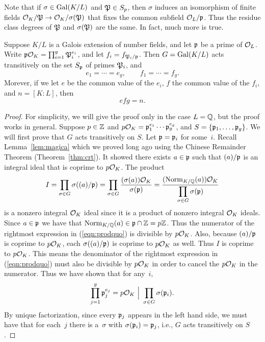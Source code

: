 Note that if $\sigma\in\Gal(K/L)$ and $\P\in S_p$, then $\sigma$
induces an isomorphism of finite fields $\O_K/\P\to \O_K/\sigma(\P)$
that fixes the common subfield $\O_L/\p$.  Thus the residue class
degrees of $\P$ and $\sigma(\P)$ are the same.  In fact, much more is
true.
\begin{theorem}\label{thm:transitive}
Suppose $K/L$ is a Galois extension of number fields,
and let $\p$ be a prime of $\O_L$.  Write
$\p\O_K=\prod_{i=1}^g \P_i^{e_i}$, and let $f_i = f_{\P_i/\p}$.
Then
$G=\Gal(K/L)$ acts transitively on the set
$S_\p$ of primes $\P_i$, and
$$
  e_1=\cdots =e_g, \qquad f_1 =\cdots = f_g.
$$
Morever, if we let $e$ be the common value of the $e_i$,
$f$ the common value of the $f_i$, and $n=[K:L]$, then
$$
   efg=n.
$$
\end{theorem}
\begin{proof}
For simplicity, we will give the proof only in the case $L=\Q$, but
the proof works in general.  Suppose $p\in\Z$ and
$p\O_K=\p_1^{e_1}\cdots \p_g^{e_g}$, and $S=\{\p_1,\ldots, \p_g\}$.  We
will first prove that $G$ acts transitively on $S$.  Let $\p=\p_i$ for
some~$i$.   Recall Lemma~\ref{lem:magica} which we proved long ago using the
Chinese Remainder Theorem (Theorem~\ref{thm:crt}). It showed there exists
$a\in\p$ such that $(a)/\p$ is an integral ideal that is
coprime to $p\O_K$.   The product
\begin{equation}\label{eqn:prodquo}
 I= \prod_{\sigma\in G} \sigma((a)/\p)
   = \prod_{\sigma\in G} \frac{(\sigma(a))\O_K}{\sigma(\p)}
    = \frac{(\Norm_{K/\Q}(a))\O_K}{\displaystyle \prod_{\sigma\in G} \sigma(\p)}
\end{equation}
is a nonzero integral $\O_K$ ideal since it is a product of nonzero
integral $\O_K$ ideals.
Since $a\in \p$ we have that
$\Norm_{K/\Q}(a) \in \p\cap\Z=p\Z$.  Thus the numerator of
the rightmost expression in (\ref{eqn:prodquo}) is
divisible by $p\O_K$.   Also, because $(a)/\p$ is coprime
to $p\O_K$, each $\sigma((a)/\p)$ is coprime to $p\O_K$
as well.   Thus $I$ is coprime to $p\O_K$.   This means the
denominator of the rightmost expression in (\ref{eqn:prodquo})
must also be divisible by $p\O_K$ in order to cancel the $p\O_K$
in the numerator.  Thus we have shown that for any~$i$,
$$
  \prod_{j=1}^g \p_j^{e_j} = p\O_K \,\,\Big|\,\, \prod_{\sigma\in G} \sigma(\p_i).
$$
By unique factorization, since every $\p_j$ appears in the left hand
side, we must have that for each~$j$ there is a~$\sigma$ with
$\sigma(\p_i)=\p_j$, i.e., $G$ acts transitively on $S$.


\end{proof}
